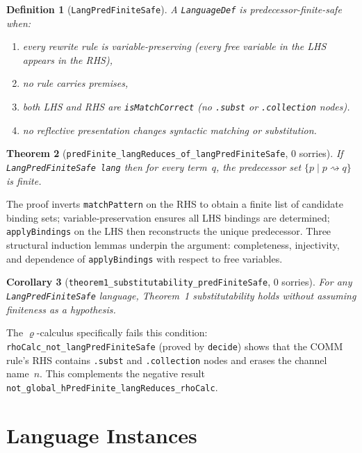 \documentclass[]{article}
\newtheorem{theorem}{Theorem}
\newtheorem{definition}[theorem]{Definition}
\newtheorem{corollary}[theorem]{Corollary}
\newcommand{\code}[1]{\texttt{#1}}
\newcommand{\rhocalc}{\ensuremath{\varrho}}
\begin{document}
\begin{definition}[\code{LangPredFiniteSafe}]
A \code{LanguageDef} is \emph{predecessor-finite-safe} when:
\begin{enumerate}
\item every rewrite rule is \emph{variable-preserving}
      (every free variable in the LHS appears in the RHS),
\item no rule carries premises,
\item both LHS and RHS are \code{isMatchCorrect}
      (no \code{.subst} or \code{.collection} nodes).
\item no reflective presentation changes syntactic matching or substitution.
\end{enumerate}
\end{definition}

\begin{theorem}[\code{predFinite\_langReduces\_of\_langPredFiniteSafe}, 0 sorries]
\label{thm:pred-finite-safe}
If \code{LangPredFiniteSafe lang} then for every term~$q$,
the predecessor set $\{p \mid p \rightsquigarrow q\}$ is finite.
\end{theorem}

The proof inverts \code{matchPattern} on the RHS to obtain a finite list of
candidate binding sets; variable-preservation ensures all LHS bindings are
determined; \code{applyBindings} on the LHS then reconstructs the unique
predecessor.  Three structural induction lemmas underpin the argument:
completeness, injectivity, and dependence of \code{applyBindings} with
respect to free variables.

\begin{corollary}[\code{theorem1\_substitutability\_predFiniteSafe}, 0 sorries]
For any \code{LangPredFiniteSafe} language, Theorem~1 substitutability holds
without assuming finiteness as a hypothesis.
\end{corollary}

The \rhocalc{}-calculus specifically fails this condition:
\code{rhoCalc\_not\_langPredFiniteSafe} (proved by \code{decide}) shows that
the COMM rule's RHS contains \code{.subst} and \code{.collection} nodes
and erases the channel name~$n$.
This complements the negative result
\code{not\_global\_hPredFinite\_langReduces\_rhoCalc}.

\section{Language Instances}
\label{sec:instances}
\end{document}
